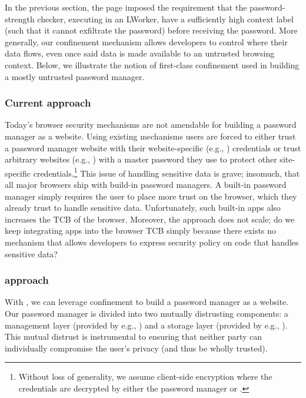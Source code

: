 In the previous section, the  page imposed the
requirement that the password-strength checker, executing in an
LWorker, have a sufficiently high context label (such that it cannot
exfiltrate the password) before receiving the password.
%
More generally, our confinement mechanism allows developers to control
where their data flows, even once said data is made available to an
untrusted browsing context.
%
Below, we illustrate the notion of first-class confinement used
in building a mostly untrusted password manager.

\subsubsection{Current approach}
%
Today's browser security mechanisms are not amendable for building a
password manager as a website.
%
Using existing mechanisms users are forced to either trust a password
manager website with their website-specific (e.g., )
credentials or trust arbitrary websites (e.g., ) with a
master password they use to protect other site-specific
credentials.\footnote{
  Without loss of generality, we assume client-side encryption where
  the credentials are decrypted by either the password manager or
  .
}
%
This issue of handling sensitive data is grave; insomuch, that all
major browsers ship with build-in password managers.
%
A built-in password manager simply requires the user to place more
trust on the browser, which they already trust to handle sensitive
data.
%
Unfortunately, such built-in apps also increases the TCB of the
browser.
%
Moreover, the approach does not scale; do we keep integrating apps
into the browser TCB simply because there exists no mechanism that
allows developers to express security policy on code that handles
sensitive data?

\subsubsection{\sys{} approach}
%
With \sys{}, we can leverage confinement to build a password manager
as a website.
%
Our password manager is
divided into two mutually distrusting components: a
management layer (provided by e.g., ) and a storage
layer (provided by e.g., ).
%
This mutual distrust is instrumental to ensuring that neither party
can individually compromise the user's privacy (and thus be wholly
trusted).
%

